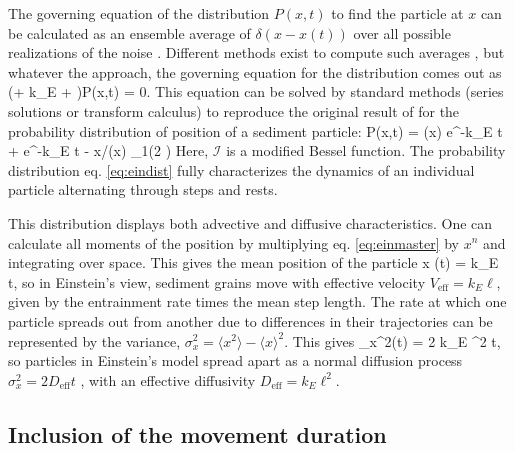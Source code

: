 The governing equation of the distribution $P(x,t)$ to find the particle at $x$ can be calculated as an ensemble average of $\delta(x-x(t))$ over all possible realizations of the noise \citep{Risken1984,Moss1989}. Different methods exist to compute such averages \citep{Hanggi1978, Hanggi1984, Balakrishnan1993, VanDenBroeck1983}, but whatever the approach, the governing equation for the distribution comes out as
\be  \big(\ell \px \pt + k_E \ell \px + \pt \big)P(x,t) = 0. \label{eq:einmaster}\ee
This equation can be solved by standard methods (series solutions or transform calculus) \citep{Arfken1985,Prudnikov1986a} to reproduce the original result of \citet{Einstein1937} for the probability distribution of position of a sediment particle:
\be P(x,t) = \delta(x) e^{-k_E t} + e^{-k_E t - x/\ell}\theta(x) _1\Big(2 \Big) \ee
Here, $\mathcal{I}$ is a modified Bessel function. 
The probability distribution eq. \ref{eq:eindist} fully characterizes the dynamics of an individual particle alternating through steps and rests. 

This distribution displays both advective and diffusive characteristics.
One can calculate all moments of the position by multiplying eq. \ref{eq:einmaster} by $x^n$ and integrating over space. This gives the mean position of the particle
\be \langle x \rangle (t) = k_E \ell t, \ee
so in Einstein's view, sediment grains move with effective velocity $V_\text{eff} = k_E \ell$, given by the entrainment rate times the mean step length.
The rate at which one particle spreads out from another due to differences in their trajectories can be represented by the variance, $\sigma_x^2  = \langle x^2 \rangle - \langle x \rangle^2$. This gives
\be \sigma_x^2(t) = 2 k_E \ell^2 t, \ee
so particles in Einstein's model spread apart as a normal diffusion process $\sigma_x^2 = 2 D_\text{eff} t$ \citep{Sokolev2002}, with an effective diffusivity $D_\text{eff} = k_E \ell^2.$


\subsection{Inclusion of the movement duration}
\label{sec:lisle}

